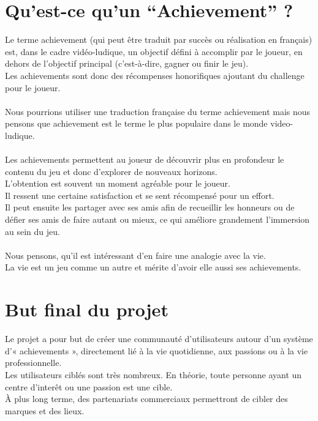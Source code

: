 \documentclass{life-fr}
\begin{document}
\section{Qu'est-ce qu'un ``Achievement'' ?}
Le terme achievement (qui peut être traduit par succès ou réalisation en français) est, dans le cadre vidéo-ludique,  un objectif défini à accomplir par le joueur, en dehors de l’objectif principal (c’est-à-dire, gagner ou finir le jeu).\\
 Les achievements sont donc des récompenses honorifiques ajoutant du challenge pour le joueur.\\
\\
Nous pourrions utiliser une traduction française du terme achievement mais nous pensons que achievement est le terme le plus populaire dans le monde video-ludique.\\
\\
Les achievements permettent au joueur de découvrir plus en profondeur le contenu du jeu et donc d’explorer de nouveaux horizons.\\
 L’obtention est souvent un moment agréable pour le joueur.\\
 Il ressent une certaine satisfaction et se sent récompensé pour un effort.\\
 Il peut ensuite les partager avec ses amis afin de recueillir les honneurs ou de défier ses amis de faire autant ou mieux, ce qui améliore grandement l’immersion au sein du jeu.\\
\\
Nous pensons, qu’il est intéressant d’en faire une analogie avec la vie.\\
 La vie est un jeu comme un autre et mérite d’avoir elle aussi ses achievements.\\

\section{But final du projet}

Le projet a pour but de créer une communauté d'utilisateurs autour d'un système d'« achievements », directement lié à la vie quotidienne, aux passions ou à la vie professionnelle.\\

Les utilisateurs ciblés sont très nombreux. En théorie, toute personne ayant un centre d'interêt ou une passion est une cible.\\

À plus long terme, des partenariats commerciaux permettront de cibler des marques et des lieux.\\
\end{document}
